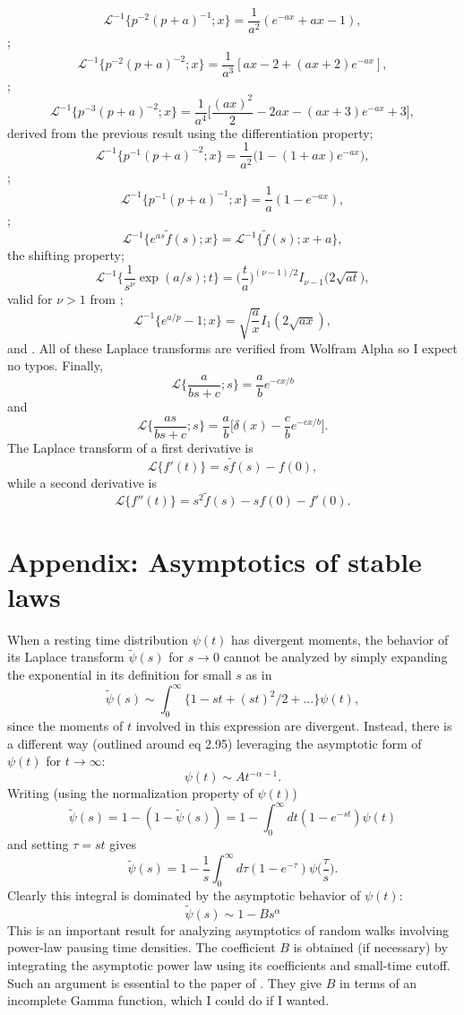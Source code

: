 \documentclass[11pt]{article}
\newcommand\be{\begin{equation}} %
\newcommand\ee{\end{equation}}   %
\newcommand\El{\mathcal{L}}
\begin{document}
\be \El^{-1}\Big\{p^{-2}(p+a)^{-1};x\Big\} = \frac{1}{a^2}(e^{-ax}+ax-1),\label{eq:lap2}\ee
\citep[][2.1.2.33]{Prudnikov1986};
\be \El^{-1}\Big\{p^{-2}(p+a)^{-2};x\Big\} = \frac{1}{a^3}[ax - 2 + (ax+2)e^{-ax}],\label{eq:lap3}\ee
\citep[][2.1.2.49]{Prudnikov1986};
\be \El^{-1}\Big\{p^{-3}(p+a)^{-2};x\Big\} = \frac{1}{a^4}\Big[\frac{(ax)^2}{2} - 2ax - (ax+3)e^{-ax} + 3\Big], \label{eq:lap4}\ee
derived from the previous result using the differentiation property;
\be \El^{-1}\Big\{p^{-1}(p+a)^{-2};x\Big\} = \frac{1}{a^2}\Big(1 -(1+ax)e^{-ax}\Big), \label{eq:lap5}\ee
\citep[][2.1.2.47]{Prudnikov1986};
\be \El^{-1}\Big\{p^{-1}(p+a)^{-1};x\Big\} = \frac{1}{a}(1-e^{-ax}),\label{eq:lap6}\ee
\citep[][2.1.2.31]{Prudnikov1986};
\be\El^{-1} \{e^{as}\tilde{f}(s);x\} = \El^{-1}\{\tilde{f}(s);x+a\},\label{eq:lap7}\ee
the shifting property;
\be \El^{-1}\big\{\frac{1}{s^\nu}\exp(a/s);t\} = \Big(\frac{t}{a}\Big)^{(\nu-1)/2}I_{\nu-1}\big(2\sqrt{a t}\big), \label{eq:lap8}\ee
valid for $\nu>1$ from \citep[][2.2.2.1]{Prudnikov1986};
\be \El^{-1}\{e^{a/p}-1;x\} = \sqrt{\frac{a}{x}}I_1(2\sqrt{ax}),\label{eq:lap9}\ee
and \citep[][2.2.2.8]{Prudnikov1986}.
All of these Laplace transforms are verified from Wolfram Alpha so I expect no typos.
Finally,
\be \El\Big\{\frac{a}{bs+c};s\Big\} = \frac{a}{b}e^{-cx/b}\label{eq:lap10}\ee
and
\be \El\Big\{\frac{as}{bs+c};s\Big\} = \frac{a}{b}\Big[\delta(x) - \frac{c}{b}e^{-cx/b}\Big].\label{eq:lap11}\ee
The Laplace transform of a first derivative is 
\be \El\{f'(t)\} = s\tilde{f}(s)-f(0),\ee
while a second derivative is 
\be \El\{f''(t)\} = s^2 \tilde{f}(s) - sf(0) -f'(0).\ee
\section*{Appendix: Asymptotics of stable laws}
When a resting time distribution $\psi(t)$ has divergent moments, the behavior of its Laplace transform $\tilde{\psi}(s)$ for $s\rightarrow0$ cannot be analyzed by simply expanding the exponential in its definition for small $s$ as in 
\be \tilde{\psi}(s) \sim \int_0^\infty \{1-st + (st)^2/2 + \dots \} \psi(t),\ee
since the moments of $t$ involved in this expression are divergent. 
Instead, there is a different way (outlined around \citet{Weiss1994} eq 2.95) leveraging the asymptotic form of $\psi(t)$ for $t\rightarrow \infty$:
\be \psi(t) \sim  A t^{-\alpha-1}.\ee
Writing (using the normalization property of $\psi(t)$)
\be \tilde{\psi}(s) = 1 - (1- \tilde{\psi}(s)) = 1 - \int_0^\infty dt (1-e^{-st})\psi(t) \ee
and setting $\tau = st$ gives
\be \tilde{\psi}(s) = 1 - \frac{1}{s} \int_0^\infty d\tau (1-e^{-\tau})\psi\big(\frac{\tau}{s}\big).\ee
Clearly this integral is dominated by the asymptotic behavior of $\psi(t)$:
\be \tilde{\psi}(s) \sim 1 - B s^\alpha \ee
This is an important result for analyzing asymptotics of random walks involving power-law pausing time densities.
The coefficient $B$ is obtained (if necessary) by integrating the asymptotic power law using its coefficients and small-time cutoff.
Such an argument is essential to the paper of \citet{Weeks1998}. They give $B$ in terms of an incomplete Gamma function, which I could do if I wanted.
\end{document}
